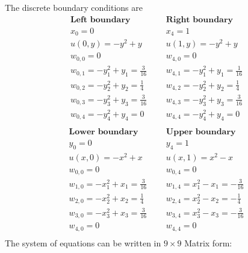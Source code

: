The discrete boundary conditions are
\[
\begin{array}{lcl}
\textbf{Left boundary}&\ \ \ & \textbf{Right boundary}\\ 
x_0=0&\ \ \ & x_4=1\\ 
u(0,y)=-y^2+y&\ \ \ & u(1,y)=-y^2+y\\

w_{0,0}=0 &\ \ \ & w_{4,0}=0\\ 
w_{0,1}=-y^2_1+y_1 =\frac{3}{16} & \ \ \ & w_{4,1}=-y^2_1+y_1 =\frac{1}{16}\\

w_{0,2}=-y^2_2+y_2 =\frac{1}{4} & \ \ \ & w_{4,2}=-y^2_2+y_2 =\frac{1}{4}\\

w_{0,3}=-y^2_3+y_3 =\frac{3}{16} & \ \ \ & w_{4,3}=-y^2_3+y_3 =\frac{3}{16}\\

w_{0,4}=-y^2_4+y_4 =0 & \ \ \ & w_{4,4}=-y^2_4+y_4 =0\\

\end{array}
\]
\[
\begin{array}{lcl}
\textbf{Lower boundary}&\ \ \ & \textbf{Upper boundary}\\ 
 y_0=0&\ \ \ & y_4=1 \\
 u(x,0)=-x^2+x&\ \ \ & u(x,1)=x^2-x \\

 w_{0,0}=0 & \ \ \ & w_{0,4}=0\\ 

w_{1,0}=-x^2_1+x_1 =\frac{3}{16}  & \ \ \ & w_{1,4}=x^2_1-x_1 =-\frac{3}{16} \\


w_{2,0}=-x^2_2+x_2 =\frac{1}{4}  & \ \ \ & w_{2,4}=x^2_2-x_2 =-\frac{1}{4} \\


w_{3,0}=-x^2_3+x_3 =\frac{3}{16}  & \ \ \ & w_{3,4}=x^2_3-x_3 =-\frac{3}{16} \\


w_{4,0}=0  & \ \ \ & w_{4,4}=0 \\

\end{array}
\]
The system of equations can be written 
in $9\times 9$ Matrix form:
